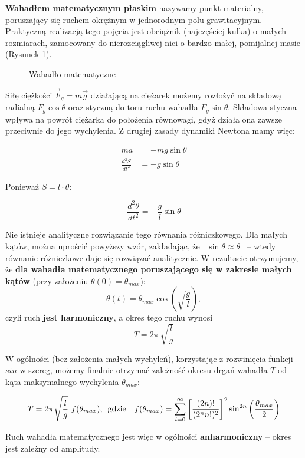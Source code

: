 \documentclass[a4paper]{article}
\begin{document}
\textbf{Wahadłem matematycznym płaskim} nazywamy punkt materialny, poruszający się ruchem okrężnym w jednorodnym polu grawitacyjnym. Praktyczną realizacją tego pojęcia jest obciążnik (najczęściej kulka) o małych rozmiarach, zamocowany do nierozciągliwej nici o bardzo małej, pomijalnej masie (Rysunek \ref{wahadlo_matematyczne}). 

\begin{figure}[h]
\caption{Wahadło matematyczne}

\label{wahadlo_matematyczne}
\end{figure}

Siłę ciężkości $\vec{F}_g = m\vec{g}$ działającą na ciężarek możemy rozłożyć na składową radialną $F_g \cos \theta$ oraz styczną do toru ruchu wahadła $F_g \sin \theta$. Składowa styczna wpływa na powrót ciężarka do położenia równowagi, gdyż działa ona zawsze przeciwnie do jego wychylenia. Z drugiej zasady dynamiki Newtona mamy więc:

\begin{align*}
 ma &= -mg\sin\theta \\
 \frac{d^2S}{dt^2} &= -g\sin\theta
\end{align*}

Ponieważ $S = l \cdot \theta$:

\[ \frac{d^2\theta}{dt^2} = -\frac{g}{l}\sin\theta \]

Nie istnieje analityczne rozwiązanie tego równania różniczkowego.
Dla małych kątów, można uprościć powyższy wzór, zakładając, że \, $\sin\theta \approx \theta$ \, -- wtedy równanie różniczkowe daje się rozwiązać analitycznie. W rezultacie otrzymujemy, że \textbf{dla wahadła matematycznego poruszającego się w zakresie małych kątów} (przy założeniu $\theta(0) = \theta_{max}$): 
\[ \theta(t) = \theta_{max}\cos\left(\sqrt{\frac{g}{l}}\right), \] 
czyli ruch \textbf{jest harmoniczny}, a okres tego ruchu wynosi
\[ T = 2\pi~\sqrt{\frac{l}{g}} \]


W ogólności (bez założenia małych wychyleń), korzystając z rozwinięcia funkcji $sin$ w szereg, możemy finalnie otrzymać zależność okresu drgań wahadła $T$ od kąta maksymalnego wychylenia $\theta_{max}$:

\[ T = 2\pi ~ \sqrt[]{\frac{l}{g}}~f(\theta_{max}) , \enskip \text{gdzie} 
\enskip \enskip f(\theta_{max}) = \sum\limits_{i=0}^{\infty} \left[ \frac{(2n)!}{(2^nn!)^2}\right]^2\sin^{2n}\left(\frac{\theta_{max}}{2} \right) \]

Ruch wahadła matematycznego jest więc w ogólności \textbf{anharmoniczny} -- okres jest zależny od amplitudy.
\end{document}
